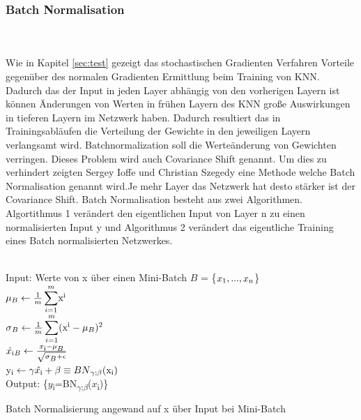 \documentclass{llncs}
\begin{document}
\subsubsection{Batch Normalisation}
~\\\\
Wie in Kapitel \ref{sec:test} gezeigt das stochastischen Gradienten Verfahren Vorteile gegenüber des normalen Gradienten Ermittlung beim Training von KNN. Dadurch das der Input in jeden Layer abhängig von den vorherigen Layern ist können Änderungen von Werten in frühen Layern des KNN große Auswirkungen in tieferen Layern im Netzwerk haben.
Dadurch resultiert das in Trainingsabläufen die Verteilung der Gewichte in den jeweiligen Layern verlangsamt wird. Batchnormalization soll die Werteänderung von Gewichten verringen. Dieses Problem wird auch Covariance Shift genannt. Um dies zu verhindert zeigten Sergey Ioffe und Christian Szegedy \cite{batchnorm} eine Methode welche Batch Normalisation genannt wird.Je mehr Layer das Netzwerk hat desto stärker ist der Covariance Shift. Batch Normalisation besteht aus zwei Algorithmen. Algortithmus 1 verändert den eigentlichen Input von Layer n zu einen normalisierten Input y und Algorithmus 2 verändert das eigentliche Training eines Batch normalisierten Netzwerkes\cite{batchnorm}.
\\\\
\begin{algorithm}[H]
	Input: Werte von x über einen Mini-Batch $B$ = \{$x\textsubscript{1},...,x\textsubscript{n}$\}\\
	\begin{math}
	\mu\textsubscript{$B$}\leftarrow\frac{1}{m}\displaystyle\sum_{i=1}^{m}$x$\textsuperscript{i}
	\end{math}\\
	\begin{math}
	\sigma\textsubscript{$B$}\leftarrow\frac{1}{m}\displaystyle\sum_{i=1}^{m}($x$\textsuperscript{i} - \mu\textsubscript{$B$})\textsuperscript{2}
	\end{math}\\
	\begin{math}
	\hat{x\textsubscript{i}}\textsubscript{$B$}\leftarrow\frac{x\textsubscript{i}-\mu\textsubscript{$B$}}{\sqrt{\sigma\textsubscript{$B$} + \epsilon}}
	\end{math}\\
	\begin{math}
	$y$\textsubscript{i}\leftarrow\gamma\hat{x\textsubscript{i}} + \beta \equiv BN\textsubscript{$\gamma$;$\beta$}($x$\textsubscript{i})
	\end{math}\\
	Output: \{$y$\textsubscript{i}=BN\textsubscript{$\gamma$;$\beta$}($x$\textsubscript{i})\}
	\caption{Batch Normalisierung angewand auf x über Input bei Mini-Batch  }	
\end{algorithm}
\end{document}

